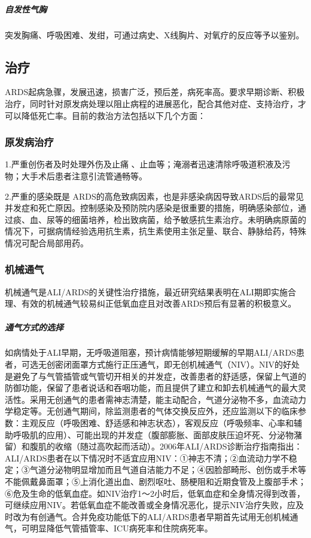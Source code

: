 \subparagraph{自发性气胸}

突发胸痛、呼吸困难、发绀，可通过病史、X线胸片、对氧疗的反应等予以鉴别。

\subsection{治疗}

ARDS起病急骤，发展迅速，损害广泛，预后差，病死率高。要求早期诊断、积极治疗，同时针对原发病处理以阻止病程的进展恶化，配合其他对症、支持治疗，才可以降低死亡率。目前的救治方法包括以下几个方面：

\subsubsection{原发病治疗}

1.严重创伤者及时处理外伤及止痛
、止血等；淹溺者迅速清除呼吸道积液及污物；大手术后患者注意引流管通畅等。

2.严重的感染既是
ARDS的高危致病因素，也是非感染病因导致ARDS后的最常见并发症和死亡原因。控制感染及预防院内感染是很重要的措施，明确感染部位，通过痰、血、尿等的细菌培养，检出致病菌，给予敏感抗生素治疗。未明确病原菌的情况下，可据病情经验选用抗生素，抗生素使用主张足量、联合、静脉给药，特殊情况可配合局部用药。

\subsubsection{机械通气}

机械通气是ALI/ARDS的关键性治疗措施，最近研究结果表明在ALI期即实施合理、有效的机械通气较易纠正低氧血症且对改善ARDS预后有显著的积极意义。

\subparagraph{通气方式的选择}

如病情处于ALI早期，无呼吸道阻塞，预计病情能够短期缓解的早期ALI/ARDS患者，可选无创密闭面罩方式施行正压通气，即无创机械通气（NIV）。NIV的好处是避免了与气管插管或气管切开相关的并发症，改善患者的舒适感，保留上气道的防御功能，保留了患者说话和吞咽功能，而且提供了建立和卸去机械通气的最大灵活性。采用无创通气的患者需神志清楚，能主动配合，气道分泌物不多，血流动力学稳定等。无创通气期间，除监测患者的气体交换反应外，还应监测以下的临床参数：主观反应（呼吸困难、舒适感和神志状态），客观反应（呼吸频率、心率和辅助呼吸肌的应用）、可能出现的并发症（腹部膨胀、面部皮肤压迫坏死、分泌物潴留）和腹肌的收缩（随过高吹起而活动）。2006年ALI/ARDS诊断治疗指南指出：ALI/ARDS患者在以下情况时不适宜应用NIV：①神志不清；②血流动力学不稳定；③气道分泌物明显增加而且气道自洁能力不足；④因脸部畸形、创伤或手术等不能佩戴鼻面罩；⑤上消化道出血、剧烈呕吐、肠梗阻和近期食管及上腹部手术；⑥危及生命的低氧血症。如NIV治疗1～2小时后，低氧血症和全身情况得到改善，可继续应用NIV。若低氧血症不能改善或全身情况恶化，提示NIV治疗失败，应及时改为有创通气。合并免疫功能低下的ALI/ARDS患者早期首先试用无创机械通气，可明显降低气管插管率、ICU病死率和住院病死率。

